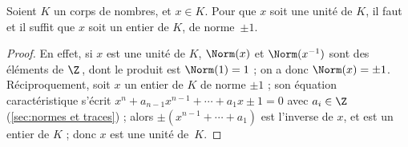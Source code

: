 \documentclass[11pt, useosf,
  title in boldface,
  theorem in new line,
  theorem numbering = section,
  number theorems separately,
]{simplivre}
\begin{document}
    \begin{proposition}\label{prop:unité est de norme +-1}
        Soient \( K \) un corps de nombres, et \( x \in K \). Pour que \( x \) soit une unité de \( K \), il faut et il suffit que \( x \) soit un entier de \( K \), de norme~\( \pm 1 \).
    \end{proposition}
    \begin{proof}
        En effet, si \( x \) est une unité de \( K \), \( \Norm(x) \) et \( \Norm(x^{-1}) \) sont des éléments de \( \Z \)\,, dont le produit est \( \Norm(1) = 1 \) ; on a donc \( \Norm(x) = \pm 1 \). Réciproquement, soit \( x \) un entier de \( K \) de norme \( \pm 1 \) ; son équation caractéristique s'écrit \( x^n + a_{n-1} x^{n-1} + \cdots + a_1 x \pm 1 = 0 \) avec \( a_i \in \Z \) (\cref{sec:normes et traces}) ; alors \( \pm (x^{n-1} + \cdots + a_1) \) est l'inverse de \( x \), et est un entier de \( K \) ; donc \( x \) est une unité de~\( K \).
    \end{proof}
\end{document}
